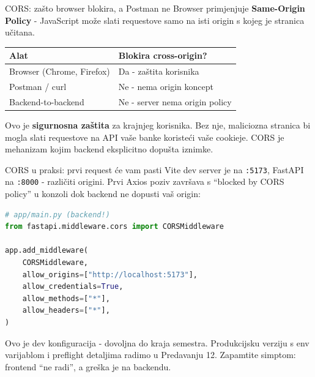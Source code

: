\begin{frame}{CORS: zašto browser blokira, a Postman ne}
Browser primjenjuje \textbf{Same-Origin Policy} - JavaScript može slati requestove samo na isti origin s kojeg je stranica učitana.

\vspace{0.4em}
\begin{tabular}{@{}ll@{}}
  \toprule
  \textbf{Alat} & \textbf{Blokira cross-origin?} \\
  \midrule
  Browser (Chrome, Firefox) & Da - zaštita korisnika \\
  Postman / curl & Ne - nema origin koncept \\
  Backend-to-backend & Ne - server nema origin policy \\
  \bottomrule
\end{tabular}

\vspace{0.6em}
Ovo je \textbf{sigurnosna zaštita} za krajnjeg korisnika. Bez nje, maliciozna stranica bi mogla slati requestove na API vaše banke koristeći vaše cookieje. CORS je mehanizam kojim backend eksplicitno dopušta iznimke.
\end{frame}

\begin{frame}[fragile,shrink=5]{CORS u praksi: prvi request će vam pasti}
Vite dev server je na \texttt{:5173}, FastAPI na \texttt{:8000} - različiti origini. Prvi Axios poziv završava s \enquote{blocked by CORS policy} u konzoli dok backend ne dopusti vaš origin:

\begin{lstlisting}[language=python]
# app/main.py (backend!)
from fastapi.middleware.cors import CORSMiddleware

app.add_middleware(
    CORSMiddleware,
    allow_origins=["http://localhost:5173"],
    allow_credentials=True,
    allow_methods=["*"],
    allow_headers=["*"],
)
\end{lstlisting}

\vspace{0.4em}
Ovo je dev konfiguracija - dovoljna do kraja semestra. Produkcijsku verziju s env varijablom i preflight detaljima radimo u Predavanju 12. Zapamtite simptom: frontend \enquote{ne radi}, a greška je na backendu.
\end{frame}

